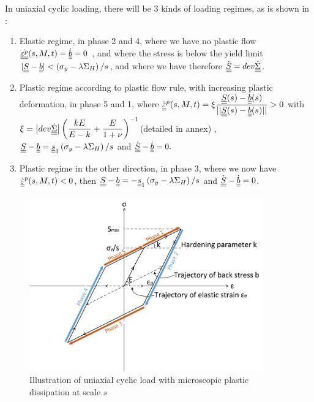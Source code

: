 In uniaxial cyclic loading, there will be 3 kinds of loading regimes, as is shown in :

\vspace{6pt}
\begin{enumerate}

\item	Elastic regime, in phase 2 and 4, where we have no plastic flow $\dot{\uline{\uline{\varepsilon^p}}}(s,M,t)=\dot{\uline{\uline{b}}}=0$ ,  and where the stress is below the yield limit $|\uline{\uline{S}}-\uline{\uline{b}}|< \left( \sigma_y-\lambda \Sigma_H\right)/s$, and where we have therefore $\dot{\uline{\uline{S}}}=dev\dot{\uline{\uline{\Sigma}}}$. 
\vspace{6pt}

\item Plastic regime according to plastic flow rule, with increasing plastic deformation, in phase 5 and 1, where	$\dot{\uline{\uline{\varepsilon}}}^p(s,M,t)=\xi\dfrac{\uline{\uline{S}}(s)-\uline{\uline{b}}(s)}{||\uline{\uline{S}}(s)-\uline{\uline{b}}(s)||}> 0$ with  $\xi= \left| dev\dot{\uline{\uline{\Sigma}}}\right| \left(\dfrac{kE}{E-k}+\dfrac{E}{1+\nu} \right) ^{-1}$(detailed in annex) ,  $\uline{\uline{S}}-\uline{\uline{b}}=\uline{\uline{s}}_1 \left(\sigma_y-\lambda \Sigma_H\right)/s$ and $\dot{\uline{\uline{S}}}-\dot{\uline{\uline{b}}}=0.$ 
\vspace{6pt}

\item Plastic regime in the other direction, in phase 3, where we now have	$\dot{\uline{\uline{\varepsilon}}}^p(s,M,t)<0$,  then $\uline{\uline{S}}-\uline{\uline{b}}=-\uline{\uline{s}}_1 \left(\sigma_y-\lambda \Sigma_H\right)/s$ and $\dot{\uline{\uline{S}}}-\dot{\uline{\uline{b}}}=0$.

\end{enumerate}	

\begin{figure}[!h]
\centering
\includegraphics[width=0.9\textwidth]{figures//backstress.png} 
\caption{Illustration of uniaxial cyclic load with microscopic plastic dissipation at scale $s$}
\label{backstress}
\end{figure}

